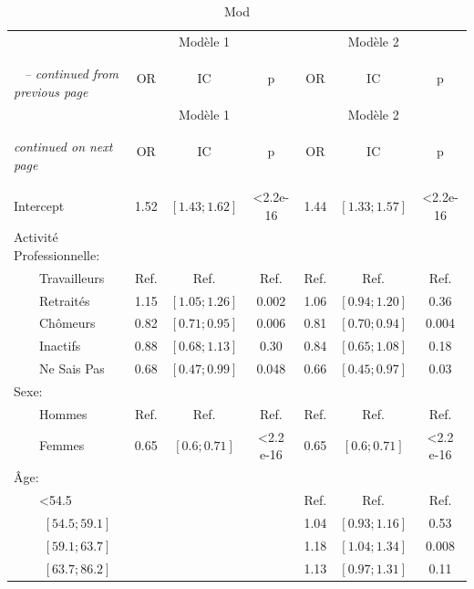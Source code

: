 \documentclass{book}
\begin{document}
\begin{longtable}{lccc|ccc}\caption{Mod}\\
    \hline  
    		 & &    Modèle 1 &   &    &   Modèle 2    &\\
		& \multirow{3}{*}{OR} & \multirow{3}{*}{IC}& \multirow{3}{*}{p} & \multirow{3}{*}{OR} & \multirow{3}{*}{IC}& \multirow{3}{*}{p}\\ 
		 &      &     &    &   	    &  	    &\\
   \hline
    \hline     
    \endfirsthead 
    \multicolumn{4}{l}{\tablename\ \thetable{} \textit{-- continued from previous page}}\\ 
    \hline
	    		 & &    Modèle 1 &   &   &   Modèle 2    &\\
		& \multirow{3}{*}{OR} & \multirow{3}{*}{IC}& \multirow{3}{*}{p} & \multirow{3}{*}{OR} & \multirow{3}{*}{IC}& \multirow{3}{*}{p}\\ 
		 &      &     &    &   	    &  	    &\\
    \hline
    \hline  
    \endhead   
    \hline
    \multicolumn{4}{l}{\textit{continued on next page}} \\ 
    &    				    &    			    &                  \\ 
    \endfoot   
    \multicolumn{4}{l}{}  \\ 
    \endlastfoot 
        
Intercept & 1.52 & $\left[1.43 ; 1.62 \right]$ & <2.2e-16 & 1.44 & $\left[1.33 ; 1.57 \right]$ & <2.2e-16\\
Activité Professionnelle: &              &              &	&&&\\ 
$\qquad$Travailleurs 		&		Ref.		& 	Ref.		&	Ref.&Ref.&Ref.&Ref.\\ 
$\qquad$Retraités&1.15 &$\left[1.05 ; 1.26 \right]$ & 0.002&1.06 &$\left[0.94 ; 1.20 \right]$ & 0.36\\ 
$\qquad$Chômeurs & 0.82& $\left[0.71 ; 0.95\right]$& 0.006 & 0.81& $\left[0.70 ; 0.94\right]$& 0.004\\ 
$\qquad$Inactifs  & 0.88& $\left[0.68 ; 1.13\right]$& 0.30 & 0.84& $\left[0.65 ; 1.08\right]$& 0.18\\  
$\qquad$Ne Sais Pas & 0.68& $\left[0.47 ; 0.99\right]$ & 0.048& 0.66& $\left[0.45 ; 0.97\right]$ & 0.03 \\
Sexe: &              &              &                        &&&  \\ 
$\qquad$Hommes &Ref. & Ref.& Ref.&Ref.&Ref.&Ref.\\ 
$\qquad$Femmes & 0.65& $\left[0.6 ; 0.71 \right]$ & <2.2 e-16& 0.65& $\left[0.6 ; 0.71 \right]$ & <2.2 e-16\\
Âge: &&&&&&\\
$\qquad$<54.5 &&&&Ref.&Ref.&Ref.\\
$\qquad$ $\left[54.5 ; 59.1 \right]$&&& &1.04& $\left[0.93 ; 1.16 \right]$& 0.53\\
$\qquad$ $\left[59.1 ; 63.7\right]$&&& &1.18&$\left[1.04 ; 1.34 \right]$& 0.008\\
$\qquad$ $\left[63.7 ; 86.2 \right]$&&&&1.13&$\left[0.97 ; 1.31 \right]$&0.11\\  
 
 
    \hline
    \end{longtable} 
\end{document}
